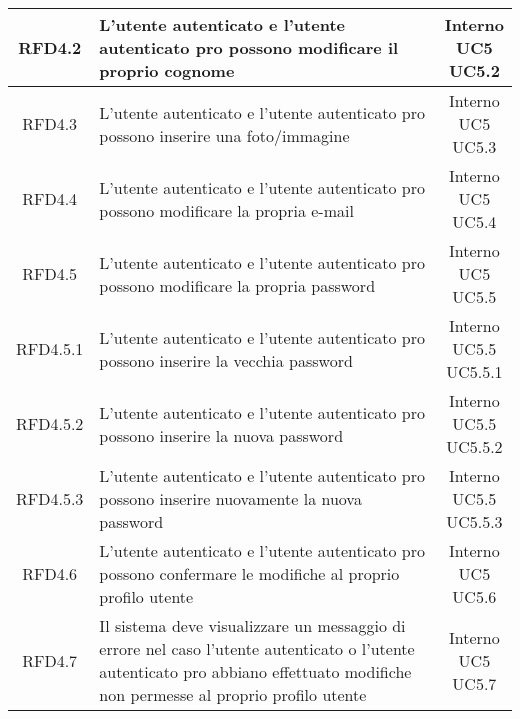 \begin{longtable}{|c|>{\centering}m{7cm}|c|}
			 \hypertarget{{RFD4.2}}{{RFD4.2}} & L’utente autenticato e l’utente
autenticato pro possono modificare il
proprio cognome & \makecell{Interno\\ UC5 \\UC5.2 } \\ \hline
			 \hypertarget{{RFD4.3}}{{RFD4.3}} & L’utente autenticato e l’utente
autenticato pro possono inserire una
foto/immagine & \makecell{Interno\\ UC5 \\UC5.3 } \\ \hline
			 \hypertarget{{RFD4.4}}{{RFD4.4}} & L’utente autenticato e l’utente
autenticato pro possono modificare la
propria e-mail & \makecell{Interno\\ UC5 \\UC5.4 } \\ \hline
			 \hypertarget{{RFD4.5}}{{RFD4.5}} & L’utente autenticato e l’utente
autenticato pro possono modificare la
propria password & \makecell{Interno\\ UC5 \\UC5.5 } \\ \hline
			 \hypertarget{{RFD4.5.1}}{{RFD4.5.1}} & L’utente autenticato e l’utente
autenticato pro possono inserire la vecchia password & \makecell{Interno\\ UC5.5 \\UC5.5.1 } \\ \hline
			 \hypertarget{{RFD4.5.2}}{{RFD4.5.2}} & L’utente autenticato e l’utente
autenticato pro possono inserire la nuova password & \makecell{Interno\\ UC5.5 \\UC5.5.2 } \\ \hline
			 \hypertarget{{RFD4.5.3}}{{RFD4.5.3}} & L’utente autenticato e l’utente
autenticato pro possono inserire nuovamente la nuova password & \makecell{Interno\\ UC5.5 \\UC5.5.3 } \\ \hline
			 \hypertarget{{RFD4.6}}{{RFD4.6}} & L’utente autenticato e l’utente
autenticato pro possono confermare le
modifiche al proprio profilo utente & \makecell{Interno\\ UC5 \\UC5.6 } \\ \hline
			 \hypertarget{{RFD4.7}}{{RFD4.7}} & Il sistema deve visualizzare un messaggio
di errore nel caso l’utente autenticato o
l’utente autenticato pro abbiano effettuato modifiche
non permesse al proprio profilo utente & \makecell{Interno\\ UC5 \\UC5.7 } \\ \hline

\end{longtable}
